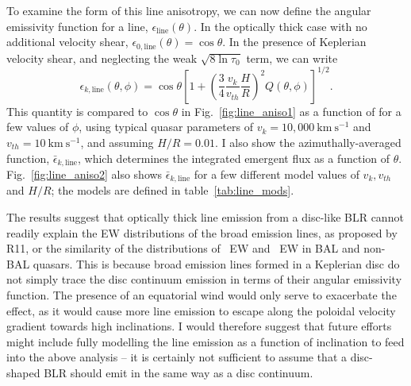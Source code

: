 To examine the form of this line anisotropy, 
we can now define the angular emissivity function for a line, $\epsilon_{\mathrm{line}}(\theta)$.
In the optically thick case with no additional velocity shear, 
$\epsilon_{0,\mathrm{line}}(\theta) = \cos \theta$.
In the presence of Keplerian velocity shear, and neglecting the weak $\sqrt{8 \ln \tau_0}$ term, 
we can write
\begin{equation}
\epsilon_{k, \mathrm{line}}(\theta, \phi) = \cos \theta \left[1 + 
\left(\frac{3}{4}\frac{v_{k}}{v_{th}}\frac{H}{R}\right)^2
Q(\theta, \phi)
\right]^{1/2}.
\end{equation}
This quantity is compared to $\cos \theta$ in Fig.~\ref{fig:line_aniso1} 
as a function of for a few values of $\phi$, 
using typical quasar parameters of $v_k=10,000~\mathrm{km~s^{-1}}$ and 
$v_{th}=10~\mathrm{km~s^{-1}}$, and assuming $H/R=0.01$. I also show the 
azimuthally-averaged function, $\bar{\epsilon}_{k,\mathrm{line}}$, 
which determines the integrated emergent flux as a function of $\theta$.
Fig.~\ref{fig:line_aniso2} also shows $\bar{\epsilon}_{k,\mathrm{line}}$ 
for a few different model values of $v_k, v_{th}$
and $H/R$; the models are defined in table~\ref{tab:line_mods}.

The results suggest that optically thick line emission from a
disc-like BLR cannot readily explain the EW distributions of the broad emission lines,
as proposed by R11, or the similarity of the distributions of \civline\ EW and 
\mgline\ EW in BAL and non-BAL quasars. 
This is because broad emission lines formed in a Keplerian disc do not simply trace 
the disc continuum emission in terms of their angular emissivity function.
The presence of an equatorial wind would only serve to exacerbate the effect,
as it would cause more line emission to escape along the poloidal velocity gradient towards high 
inclinations. I would therefore suggest that future efforts might include fully modelling 
the line emission as a function of inclination to feed into the above analysis -- it is certainly
not sufficient to assume that a disc-shaped BLR should emit in the same way as a disc continuum.

